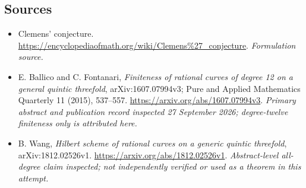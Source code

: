 \documentclass[11pt]{article}
\begin{document}
\subsection{Sources}
\begin{itemize}
\item[S1]Clemens' conjecture.
\url{https://encyclopediaofmath.org/wiki/Clemens%27_conjecture}.
\textit{Formulation source.}
\item[E1]E. Ballico and C. Fontanari, \emph{Finiteness of rational curves of degree 12 on a general quintic threefold}, arXiv:1607.07994v3; Pure and Applied Mathematics Quarterly 11 (2015), 537--557.
\url{https://arxiv.org/abs/1607.07994v3}.
\textit{Primary abstract and publication record inspected 27 September 2026; degree-twelve finiteness only is attributed here.}
\item[E2]B. Wang, \emph{Hilbert scheme of rational curves on a generic quintic threefold}, arXiv:1812.02526v1.
\url{https://arxiv.org/abs/1812.02526v1}.
\textit{Abstract-level all-degree claim inspected; not independently verified or used as a theorem in this attempt.}
\end{itemize}
\end{document}
